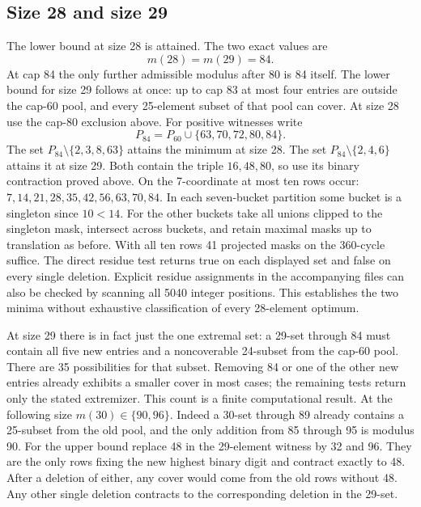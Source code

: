 \subsection*{Size 28 and size 29}
The lower bound at size 28 is attained. The two exact values are
\[
                            m(28)=m(29)=84.
\]
At cap 84 the only further admissible modulus after 80 is 84 itself. The lower bound for size 29 follows at once: up to cap 83 at most four entries are outside the cap-60 pool, and every 25-element subset of that pool can cover. At size 28 use the cap-80 exclusion above. For positive witnesses write
\[
 P_{84}=P_{60}\cup\{63,70,72,80,84\}.
\]
The set $P_{84}\setminus\{2,3,8,63\}$ attains the minimum at size 28. The set $P_{84}\setminus\{2,4,6\}$ attains it at size 29. Both contain the triple $16,48,80$, so use its binary contraction proved above. On the 7-coordinate at most ten rows occur: $7,14,21,28,35,42,56,63,70,84$. In each seven-bucket partition some bucket is a singleton since $10<14$. For the other buckets take all unions clipped to the singleton mask, intersect across buckets, and retain maximal masks up to translation as before. With all ten rows 41 projected masks on the 360-cycle suffice. The direct residue test returns true on each displayed set and false on every single deletion. Explicit residue assignments in the accompanying files can also be checked by scanning all 5040 integer positions. This establishes the two minima without exhaustive classification of every 28-element optimum.

At size 29 there is in fact just the one extremal set: a 29-set through 84 must contain all five new entries and a noncoverable 24-subset from the cap-60 pool. There are 35 possibilities for that subset. Removing 84 or one of the other new entries already exhibits a smaller cover in most cases; the remaining tests return only the stated extremizer. This count is a finite computational result. At the following size $m(30)\in\{90,96\}$. Indeed a 30-set through 89 already contains a 25-subset from the old pool, and the only addition from 85 through 95 is modulus 90. For the upper bound replace 48 in the 29-element witness by 32 and 96. They are the only rows fixing the new highest binary digit and contract exactly to 48. After a deletion of either, any cover would come from the old rows without 48. Any other single deletion contracts to the corresponding deletion in the 29-set.

